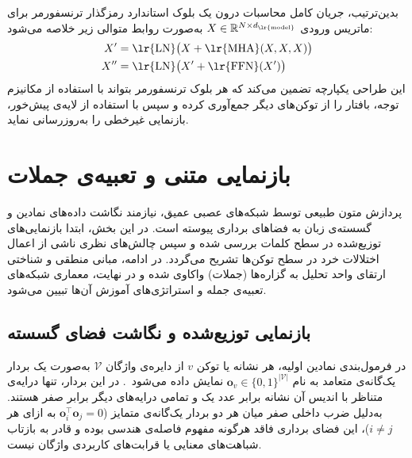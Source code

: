 بدین‌ترتیب، جریان کامل محاسبات درون یک بلوک استاندارد رمزگذار ترنسفورمر برای ماتریس ورودی $X \in \mathbb{R}^{N \times d_{\text{\lr{model}}}}$ به‌صورت روابط متوالی زیر خلاصه می‌شود:
\begin{align}
    X^{\prime} &= \text{\lr{LN}}\big(X + \text{\lr{MHA}}(X, X, X)\big) \label{eq:chap2_transformer_block1} \\
    X^{\prime\prime} &= \text{\lr{LN}}\big(X^{\prime} + \text{\lr{FFN}}(X^{\prime})\big) \label{eq:chap2_transformer_block2}
\end{align}
این طراحی یکپارچه تضمین می‌کند که هر بلوک ترنسفورمر بتواند با استفاده از مکانیزم توجه، بافتار را از توکن‌های دیگر جمع‌آوری کرده و سپس با استفاده از لایه‌ی پیش‌خور، بازنمایی غیرخطی را به‌روزرسانی نماید.



\section{بازنمایی متنی و تعبیه‌ی جملات}\label{sec:2-3}

پردازش متون طبیعی توسط شبکه‌های عصبی عمیق، نیازمند نگاشت داده‌های نمادین و گسسته‌ی زبان به فضاهای برداری پیوسته است. در این بخش، ابتدا بازنمایی‌های توزیع‌شده در سطح کلمات بررسی شده و سپس چالش‌های نظری ناشی از اعمال اختلالات خرد در سطح توکن‌ها تشریح می‌گردد. در ادامه، مبانی منطقی و شناختی ارتقای واحد تحلیل به گزاره‌ها (جملات) واکاوی شده و در نهایت، معماری شبکه‌های تعبیه‌ی جمله و استراتژی‌های آموزش آن‌ها تبیین می‌شود.


\subsection{بازنمایی توزیع‌شده و نگاشت فضای گسسته}\label{sec:2-3-1}

در فرمول‌بندی نمادین اولیه، هر نشانه یا توکن $v$ از دایره‌ی واژگان $\mathcal{V}$ به‌صورت یک بردار یک‌گانه‌ی متعامد به نام $\mathbf{o}_v \in {\{0, 1\}}^{|\mathcal{V}|}$ نمایش داده می‌شود~\cite{manning2008introduction}. در این بردار، تنها درایه‌ی متناظر با اندیس آن نشانه برابر عدد یک و تمامی درایه‌های دیگر برابر صفر هستند. به‌دلیل ضرب داخلی صفر میان هر دو بردار یک‌گانه‌ی متمایز ($\mathbf{o}_i^\top \mathbf{o}_j = 0$ به ازای هر $i \neq j$)، این فضای برداری فاقد هرگونه مفهوم فاصله‌ی هندسی بوده و قادر به بازتاب شباهت‌های معنایی یا قرابت‌های کاربردی واژگان نیست.

